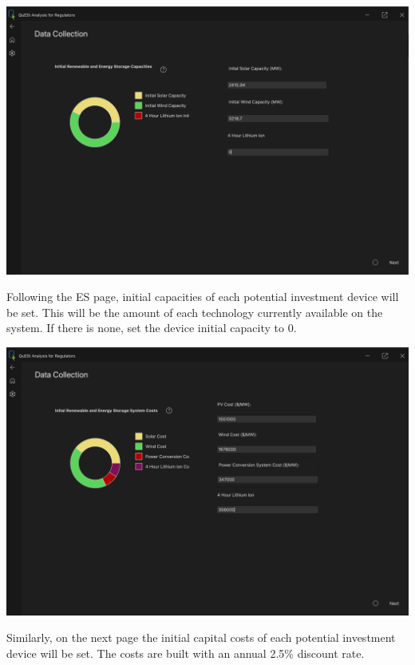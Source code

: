 \documentclass{article}
\begin{document}
\begin{center}
    \includegraphics[width=0.8\linewidth]{pics/init_caps.png}
\end{center}
Following the ES page, initial capacities of each potential investment device will be set. This will be the amount of each technology currently available on the system. If there is none, set the device initial capacity to 0.

\begin{center}
    \includegraphics[width=0.8\linewidth]{pics/cap_cost.png}
\end{center}
Similarly, on the next page the initial capital costs of each potential investment device will be set. The costs are built with an annual 2.5\% discount rate. 
\end{document}
